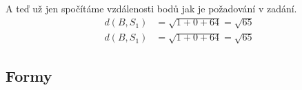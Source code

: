 \begin{example}
    A teď už jen spočítáme vzdálenosti bodů jak je požadování v zadání.
    \begin{align*}
        d(B, S_1) &= \sqrt{1 + 0 + 64} = \sqrt{65}\\
        d(B, S_1) &= \sqrt{1 + 0 + 64} = \sqrt{65}
    \end{align*}
\end{example}

\subsection{Formy}
